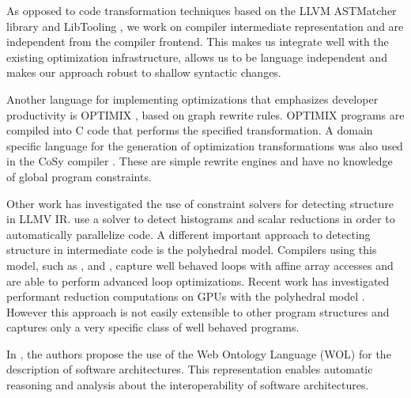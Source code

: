     As opposed to code transformation techniques based on the LLVM ASTMatcher
    library and LibTooling \citep{be0fa11ddb194bde86a9dab8589b779c}, we work on
    compiler intermediate representation and are independent from the compiler
    frontend.
    This makes us integrate well with the existing optimization infrastructure,
    allows us to be language independent and makes our approach robust to
    shallow syntactic changes.

    Another language for implementing optimizations that emphasizes developer
    productivity is OPTIMIX \citep{Assmann1996,Assmann98optimix}, based on graph
    rewrite rules.
    OPTIMIX programs are compiled into C code that performs the specified
    transformation.
    A domain specific language for the generation of optimization
    transformations was also used in the CoSy compiler \citep{Alt1994}.
    These are simple rewrite engines and have no knowledge of global program
    constraints.

    Other work has investigated the use of constraint solvers for
    detecting structure in LLMV IR.
    \citet{ginsbach2017discovery} use a solver to detect histograms and
    scalar reductions in order to automatically parallelize code.
    A different important approach to detecting structure in intermediate
    code is the polyhedral model.
    Compilers using this model, such as
    \citet{Lengauer2012Polly}, \citet{Baskaran:2010:ACC:2175462.2175482} and
    \citet{Verdoolaege:2013:PPC:2400682.2400713}, capture well behaved
    loops with affine array accesses and are able to perform advanced loop
    optimizations.
    Recent work has investigated performant reduction computations on GPUs with
    the polyhedral model \citep{Reddy2016Reduction}.
    However this approach is not easily extensible to other program structures
    and captures only a very specific class of well behaved programs.

    In \cite{Yuan:2017:TOS:3101282.3101287}, the authors propose the use of the
    Web Ontology Language (WOL) for the description of software architectures.
    This representation enables automatic reasoning and analysis about the
    interoperability of software architectures.